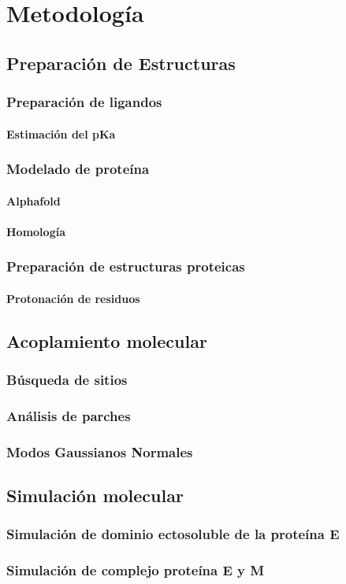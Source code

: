 \chapter{Metodología}
\label{ch2}

\section{Preparación de Estructuras}
\lipsum[2-2]
    \subsection{Preparación de ligandos}
    \subsubsection{Estimación del pKa}
    \subsection{Modelado de proteína}
    \subsubsection{Alphafold}
    \subsubsection{Homología}
    \subsection{Preparación de estructuras proteicas}
    \subsubsection{Protonación de residuos}
\section{Acoplamiento molecular}
	\subsection{Búsqueda de sitios}
	\subsection{Análisis de parches}
	\subsection{Modos Gaussianos Normales}
\section{Simulación molecular}
    \subsection{Simulación de dominio ectosoluble de la proteína E}
    \subsection{Simulación de complejo proteína E y M}